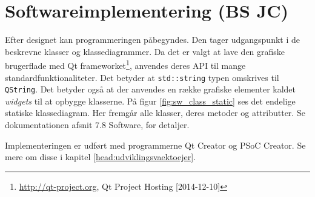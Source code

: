 \section{Softwareimplementering (BS JC)}\label{head:sw_impl}
Efter designet kan programmeringen påbegyndes. Den tager udgangspunkt i de beskrevne klasser og klassediagrammer.
Da det er valgt at lave den grafiske brugerflade med Qt frameworket\footnote{\url{http://qt-project.org}, Qt Project Hosting [2014-12-10]}, anvendes deres API til mange standardfunktionaliteter. Det betyder at \verb+std::string+ typen omskrives til \verb+QString+. 
Det betyder også at der anvendes en række grafiske elementer kaldet \textit{widgets} til at opbygge klasserne. På figur \ref{fig:sw_class_static} ses det endelige statiske klassediagram. Her fremgår alle klasser, deres metoder og attributter.
Se dokumentationen afsnit 7.8 Software, for detaljer.


Implementeringen er udført med programmerne Qt Creator og PSoC Creator. Se mere om disse i kapitel \ref{head:udviklingsvaektoejer}.

